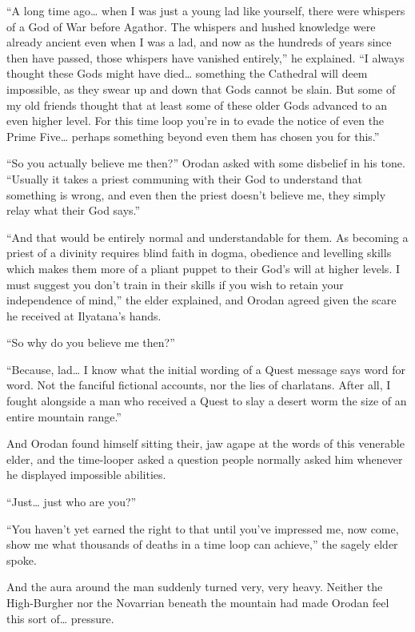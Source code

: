 \documentclass[a4paper,10pt]{book}
\begin{document}
“A long time ago… when I was just a young lad like yourself, there were whispers of a God of War before Agathor. The whispers and hushed knowledge were already ancient even when I was a lad, and now as the hundreds of years since then have passed, those whispers have vanished entirely,” he explained. “I always thought these Gods might have died… something the Cathedral will deem impossible, as they swear up and down that Gods cannot be slain. But some of my old friends thought that at least some of these older Gods advanced to an even higher level. For this time loop you’re in to evade the notice of even the Prime Five… perhaps something beyond even them has chosen you for this.”\par
“So you actually believe me then?” Orodan asked with some disbelief in his tone. “Usually it takes a priest communing with their God to understand that something is wrong, and even then the priest doesn’t believe me, they simply relay what their God says.”\par
“And that would be entirely normal and understandable for them. As becoming a priest of a divinity requires blind faith in dogma, obedience and levelling skills which makes them more of a pliant puppet to their God’s will at higher levels. I must suggest you don’t train in their skills if you wish to retain your independence of mind,” the elder explained, and Orodan agreed given the scare he received at Ilyatana’s hands.\par
“So why do you believe me then?”\par
“Because, lad… I know what the initial wording of a Quest message says word for word. Not the fanciful fictional accounts, nor the lies of charlatans. After all, I fought alongside a man who received a Quest to slay a desert worm the size of an entire mountain range.”\par
And Orodan found himself sitting their, jaw agape at the words of this venerable elder, and the time-looper asked a question people normally asked him whenever he displayed impossible abilities.\par
“Just… just who are you?”\par
“You haven’t yet earned the right to that until you’ve impressed me, now come, show me what thousands of deaths in a time loop can achieve,” the sagely elder spoke.\par
And the aura around the man suddenly turned very, very heavy. Neither the High-Burgher nor the Novarrian beneath the mountain had made Orodan feel this sort of… pressure.\par
\end{document}
